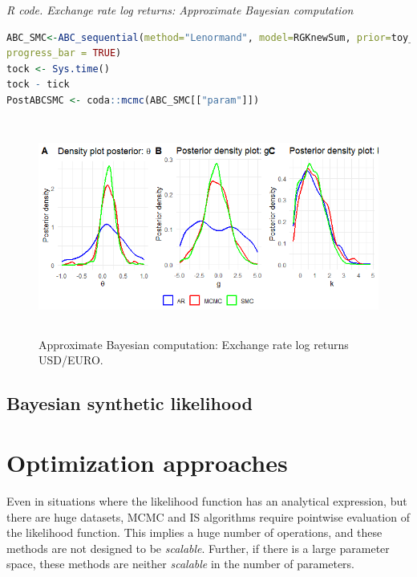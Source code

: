 \begin{tcolorbox}[enhanced,width=4.67in,center upper,
	fontupper=\large\bfseries,drop shadow southwest,sharp corners]
	\textit{R code. Exchange rate log returns: Approximate Bayesian computation}
	\begin{VF}
		\begin{lstlisting}[language=R]
ABC_SMC<-ABC_sequential(method="Lenormand", model=RGKnewSum, prior=toy_prior, summary_stat_target=sum_stat_obs, nb_simul = 10000, alpha = 0.5, p_acc_min = 0.05,
progress_bar = TRUE)
tock <- Sys.time()
tock - tick
PostABCSMC <- coda::mcmc(ABC_SMC[["param"]])
		\end{lstlisting}
	\end{VF}
\end{tcolorbox}

\begin{figure}[!h]
	\includegraphics[width=340pt, height=200pt]{Chapters/chapter15/figures/ABCexcrate.png}
	\caption[List of figure caption goes here]{Approximate Bayesian computation: Exchange rate log returns USD/EURO.}\label{figABCexc}
\end{figure}

  




\subsection{Bayesian synthetic likelihood}\label{sec15_13}

\section{Optimization approaches}\label{sec15_2}

Even in situations where the likelihood function has an analytical expression, but there are huge datasets, MCMC and IS algorithms require pointwise evaluation of the likelihood function. This implies a huge number of operations, and these methods are not designed to be \textit{scalable}. Further, if there is a large parameter space, these methods are neither \textit{scalable} in the number of parameters.

